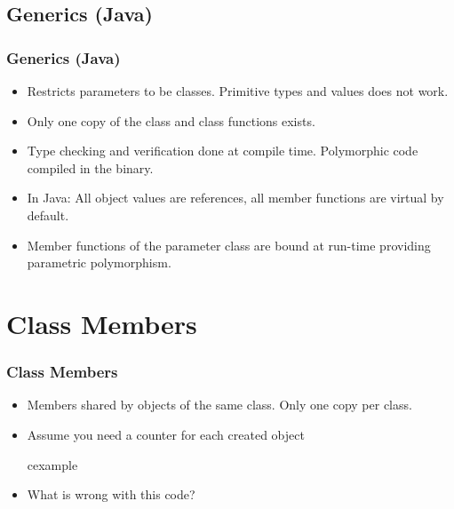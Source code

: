 \subsection{Generics (Java)}
\begin{frame}
\frametitle{Generics (Java)}
\begin{itemize}
\item Restricts parameters to be classes. Primitive types and values does not work.
\item Only one copy of the class and class functions exists.
\item Type checking and verification done at compile time. Polymorphic code compiled in the binary.
\item In Java: All object values are references, all member functions are virtual by default.
\item Member functions of the parameter class are bound at run-time 
providing parametric polymorphism.
\end{itemize}
\end{frame}

\section{Class Members}
\begin{frame}
\frametitle{Class Members}
\begin{itemize}
\item Members shared by objects of the same class. Only one copy per class.
\item Assume you need a counter for each created object
\begin{beamercolorbox}{cexample}
\codeclassmemone
\end{beamercolorbox}
\item What is wrong with this code? 
\end{itemize}
\end{frame}

